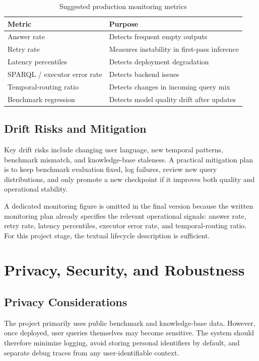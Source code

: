 \documentclass[a4paper,11pt]{article}
\begin{document}
\begin{table}[H]
\centering
\caption{Suggested production monitoring metrics}
\label{tab:monitoring}
\begin{tabular}{p{5.2cm}p{7.2cm}}
\toprule
\textbf{Metric} & \textbf{Purpose} \\
\midrule
Answer rate & Detects frequent empty outputs \\
Retry rate & Measures instability in first-pass inference \\
Latency percentiles & Detects deployment degradation \\
SPARQL / executor error rate & Detects backend issues \\
Temporal-routing ratio & Detects changes in incoming query mix \\
Benchmark regression & Detects model quality drift after updates \\
\bottomrule
\end{tabular}
\end{table}

\subsection{Drift Risks and Mitigation}

Key drift risks include changing user language, new temporal patterns, benchmark mismatch, and knowledge-base staleness. A practical mitigation plan is to keep benchmark evaluation fixed, log failures, review new query distributions, and only promote a new checkpoint if it improves both quality and operational stability.

\noindent A dedicated monitoring figure is omitted in the final version because the written monitoring plan already specifies the relevant operational signals: answer rate, retry rate, latency percentiles, executor error rate, and temporal-routing ratio. For this project stage, the textual lifecycle description is sufficient.

\section{Privacy, Security, and Robustness}

\subsection{Privacy Considerations}

The project primarily uses public benchmark and knowledge-base data. However, once deployed, user queries themselves may become sensitive. The system should therefore minimize logging, avoid storing personal identifiers by default, and separate debug traces from any user-identifiable context.
\end{document}
